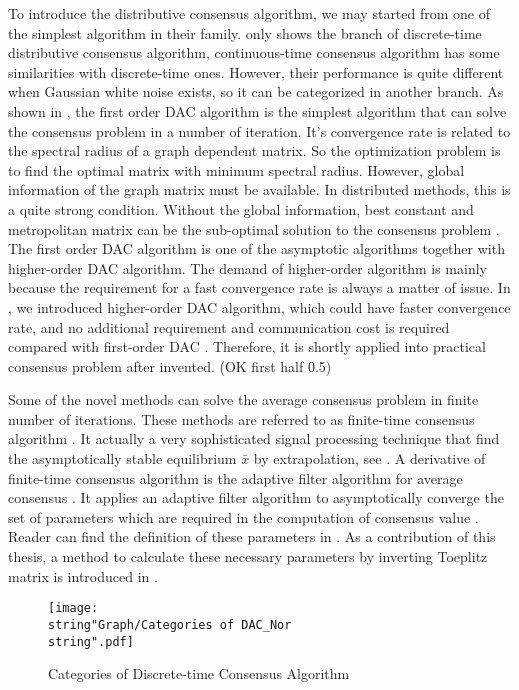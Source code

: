 To introduce the distributive consensus algorithm, we may started
from one of the simplest algorithm in their family. 
only shows the branch of discrete-time distributive consensus algorithm,
continuous-time consensus algorithm has some similarities with discrete-time
ones. However, their performance is quite different when Gaussian
white noise exists, so it can be categorized in another branch. As
shown in , the first order DAC
algorithm is the simplest algorithm that can solve the consensus problem
in a number of iteration. It's convergence rate is related to the
spectral radius of a graph dependent matrix. So the optimization problem
is to find the optimal matrix with minimum spectral radius. However,
global information of the graph matrix must be available. In distributed
methods, this is a quite strong condition. Without the global information,
best constant and metropolitan matrix can be the sub-optimal solution
to the consensus problem \cite{Xiao2004}. The first order DAC algorithm
is one of the asymptotic algorithms together with higher-order DAC
algorithm. The demand of higher-order algorithm is mainly because
the requirement for a fast convergence rate is always a matter of
issue. In , we introduced higher-order
DAC algorithm, which could have faster convergence rate, and no additional
requirement and communication cost is required compared with first-order
DAC \cite{Xiong2010}. Therefore, it is shortly applied into practical
consensus problem after invented. (OK first half 0.5)

Some of the novel methods can solve the average consensus problem
in finite number of iterations. These methods are referred to as finite-time
consensus algorithm \cite{Sundaram2007}. It actually a very sophisticated
signal processing technique that find the asymptotically stable equilibrium
$\bar{x}$ by extrapolation, see .
A derivative of finite-time consensus algorithm is the adaptive filter
algorithm for average consensus . It applies an adaptive filter algorithm
to asymptotically converge the set of parameters which are required
in the computation of consensus value \cite{Cavalcante2010}. Reader
can find the definition of these parameters in .
As a contribution of this thesis, a method to calculate these necessary
parameters by inverting Toeplitz matrix is introduced in . 

\begin{figure}
\hfill{}\texttt{[image: \\string"Graph/Categories of DAC\_Nor\\string".pdf]}\hfill{}

\caption{\label{fig:Categories-of-Discrete-time}Categories of Discrete-time
Consensus Algorithm}
\end{figure}

